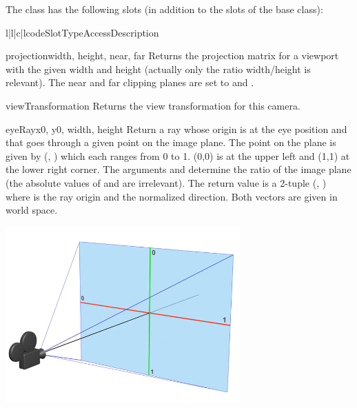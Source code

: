 The  class has the following slots (in addition to
the slots of the  base class):

\begin{tableiv}{l|l|c|l}{code}{Slot}{Type}{Access}{Description}
\end{tableiv}

\begin{methoddesc}{projection}{width, height, near, far}
Returns the projection matrix for a viewport with the given width and
height (actually only the ratio width/height is relevant). The near
and far clipping planes are set to  and .
\end{methoddesc}

\begin{methoddesc}{viewTransformation}{}
Returns the view transformation for this camera.
\end{methoddesc}

\begin{methoddesc}{eyeRay}{x0, y0, width, height}
Return a ray whose origin is at the eye position and that goes through
a given point on the image plane. The point on the plane is given by
(, ) which each ranges from 0 to 1. (0,0) is at the
upper left and (1,1) at the lower right corner. The arguments  and
 determine the ratio of the image plane (the absolute
values of  and
 are irrelevant). The return value is a 2-tuple (, )
where  is the ray origin and  the normalized
direction. Both vectors are given in world space.

\begin{center}
\includegraphics[width=9cm]{pics/camera01}
\end{center}
\end{methoddesc}

